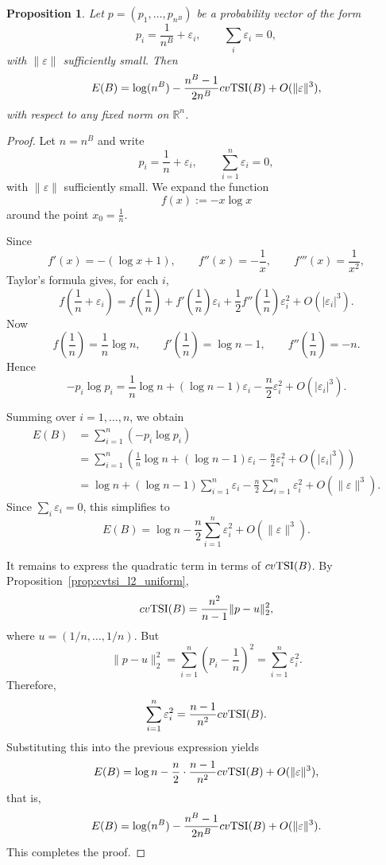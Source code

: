 \documentclass[11pt]{amsart}
\newtheorem{prop}{Proposition}[section]
\theoremstyle{definition}
\newcommand{\tsi}[0]{\textup{TSI}}
\begin{document}
\begin{prop}\label{prop:entropy_expansion}
Let $p=(p_1,\dots,p_{n^B})$ be a probability vector of the form
\[
p_i=\frac{1}{n^B}+\varepsilon_i,
\qquad
\sum_i \varepsilon_i=0,
\]
with $\|\varepsilon\|$ sufficiently small. Then
\[
E(B)=\log(n^B)-\frac{n^B-1}{2n^B}cv\tsi(B)+O(\|\varepsilon\|^3),
\]
with respect to any fixed norm on $\mathbb{R}^n$.
\end{prop}

\begin{proof}
Let $n=n^B$ and write
\[
p_i=\frac{1}{n}+\varepsilon_i,
\qquad
\sum_{i=1}^n \varepsilon_i=0,
\]
with $\|\varepsilon\|$ sufficiently small. We expand the function
\[
f(x):=-x\log x
\]
around the point $x_0=\frac{1}{n}$.

Since
\[
f'(x)=-(\log x+1),
\qquad
f''(x)=-\frac{1}{x},
\qquad
f'''(x)=\frac{1}{x^2},
\]
Taylor's formula gives, for each $i$,
\[
f\!\left(\frac{1}{n}+\varepsilon_i\right)
=
f\!\left(\frac{1}{n}\right)
+
f'\!\left(\frac{1}{n}\right)\varepsilon_i
+
\frac12 f''\!\left(\frac{1}{n}\right)\varepsilon_i^2
+
O(|\varepsilon_i|^3).
\]
Now
\[
f\!\left(\frac{1}{n}\right)=\frac{1}{n}\log n,
\qquad
f'\!\left(\frac{1}{n}\right)=\log n-1,
\qquad
f''\!\left(\frac{1}{n}\right)=-n.
\]
Hence
\[
-p_i\log p_i
=
\frac{1}{n}\log n
+
(\log n-1)\varepsilon_i
-\frac{n}{2}\varepsilon_i^2
+
O(|\varepsilon_i|^3).
\]

Summing over $i=1,\dots,n$, we obtain
\begin{align*}
E(B)
&=
\sum_{i=1}^n \left(-p_i\log p_i\right)\\
&=
\sum_{i=1}^n
\left(
\frac{1}{n}\log n
+
(\log n-1)\varepsilon_i
-\frac{n}{2}\varepsilon_i^2
+
O(|\varepsilon_i|^3)
\right)\\
&=
\log n
+
(\log n-1)\sum_{i=1}^n \varepsilon_i
-\frac{n}{2}\sum_{i=1}^n \varepsilon_i^2
+
O(\|\varepsilon\|^3).
\end{align*}
Since $\sum_i \varepsilon_i=0$, this simplifies to
\[
E(B)=\log n-\frac{n}{2}\sum_{i=1}^n \varepsilon_i^2+O(\|\varepsilon\|^3).
\]

It remains to express the quadratic term in terms of $cv\tsi(B)$. By Proposition~\ref{prop:cvtsi_l2_uniform},
\[
cv\tsi(B)=\frac{n^2}{n-1}\|p-u\|_2^2,
\]
where $u=(1/n,\dots,1/n)$. But
\[
\|p-u\|_2^2=\sum_{i=1}^n \left(p_i-\frac{1}{n}\right)^2
=\sum_{i=1}^n \varepsilon_i^2.
\]
Therefore,
\[
\sum_{i=1}^n \varepsilon_i^2=\frac{n-1}{n^2}cv\tsi(B).
\]
Substituting this into the previous expression yields
\[
E(B)
=
\log n
-\frac{n}{2}\cdot \frac{n-1}{n^2}cv\tsi(B)
+
O(\|\varepsilon\|^3),
\]
that is,
\[
E(B)=\log(n^B)-\frac{n^B-1}{2n^B}cv\tsi(B)+O(\|\varepsilon\|^3).
\]
This completes the proof.
\end{proof}
\end{document}
